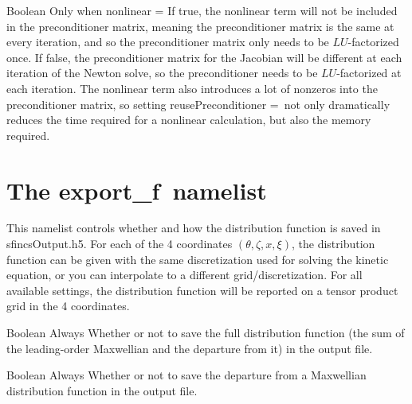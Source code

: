 {Boolean}
{\true}
{Only when {\ttfamily nonlinear} = \true}
{If true, the nonlinear term will not be included in the preconditioner matrix, meaning the preconditioner matrix is the same
at every iteration, and so the preconditioner matrix only needs to be $LU$-factorized once.  If false, the preconditioner matrix
for the Jacobian will be different at each iteration of the Newton solve, so the preconditioner needs to be $LU$-factorized at
each iteration.  The nonlinear term also introduces a lot of nonzeros into the preconditioner matrix, so setting
{\ttfamily reusePreconditioner =}\true~not only dramatically reduces the time required for a nonlinear calculation, but also the memory required.}










\section{The {\ttfamily export\_f}~namelist}

This namelist controls whether and how the distribution function is saved in {\ttfamily sfincsOutput.h5}.
For each of the 4 coordinates $(\theta, \zeta, x, \xi)$, the distribution function can be given with the same discretization
used for solving the kinetic equation, or you can interpolate to a different grid/discretization.
For all available settings, the distribution function will be reported on a tensor product grid in the 4 coordinates.

\myhrule

{Boolean}
{\false}
{Always}
{Whether or not to save the full distribution function (the sum of the leading-order Maxwellian and the departure from it)
in the output file.}

\myhrule

{Boolean}
{\false}
{Always}
{Whether or not to save the departure from a Maxwellian distribution function in the output file.}

\myhrule

